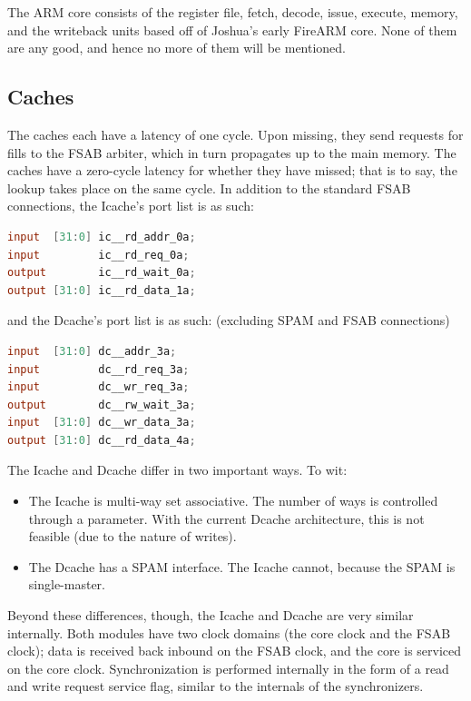 \documentclass[10pt]{article}
\begin{document}
The ARM core consists of the register file, fetch, decode, issue, execute,
memory, and the writeback units based off of Joshua's early FireARM core.
None of them are any good, and hence no more of them will be mentioned.

\subsection{Caches}
The caches each have a latency of one cycle. Upon missing, they send
requests for fills to the FSAB arbiter, which in turn propagates up to the
main memory. The caches have a zero-cycle latency for whether they have
missed; that is to say, the lookup takes place on the same cycle. In
addition to the standard FSAB connections, the Icache's port list is as
such:

\begin{lstlisting}[basicstyle=\footnotesize,language=Verilog]
input  [31:0] ic__rd_addr_0a;
input         ic__rd_req_0a;
output        ic__rd_wait_0a;
output [31:0] ic__rd_data_1a;
\end{lstlisting}

and the Dcache's port list is as such: (excluding SPAM and FSAB connections)

\begin{lstlisting}[basicstyle=\footnotesize,language=Verilog]
input  [31:0] dc__addr_3a;
input         dc__rd_req_3a;
input         dc__wr_req_3a;
output        dc__rw_wait_3a;
input  [31:0] dc__wr_data_3a;
output [31:0] dc__rd_data_4a;
\end{lstlisting}

The Icache and Dcache differ in two important ways. To wit:

\begin{itemize}
\item{The Icache is multi-way set associative. The number of ways is
controlled through a parameter. With the current Dcache architecture, this
is not feasible (due to the nature of writes).}
\item{The Dcache has a SPAM interface. The Icache cannot, because the SPAM
is single-master.}
\end{itemize}

Beyond these differences, though, the Icache and Dcache are very similar
internally. Both modules have two clock domains (the core clock and the FSAB
clock); data is received back inbound on the FSAB clock, and the core is
serviced on the core clock. Synchronization is performed internally in the
form of a read and write request service flag, similar to the internals of
the synchronizers.
\end{document}
